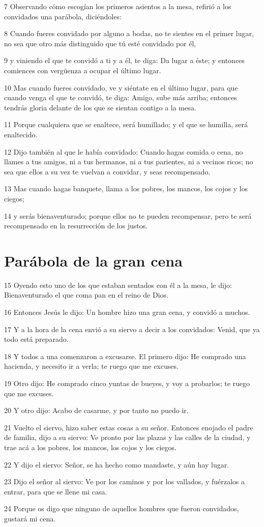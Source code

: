 \par 7 Observando cómo escogían los primeros asientos a la mesa, refirió a los convidados una parábola, diciéndoles:
\par 8 Cuando fueres convidado por alguno a bodas, no te sientes en el primer lugar, no sea que otro más distinguido que tú esté convidado por él,
\par 9 y viniendo el que te convidó a ti y a él, te diga: Da lugar a éste; y entonces comiences con vergüenza a ocupar el último lugar.
\par 10 Mas cuando fueres convidado, ve y siéntate en el último lugar, para que cuando venga el que te convidó, te diga: Amigo, sube más arriba; entonces tendrás gloria delante de los que se sientan contigo a la mesa.
\par 11 Porque cualquiera que se enaltece, será humillado; y el que se humilla, será enaltecido.
\par 12 Dijo también al que le había convidado: Cuando hagas comida o cena, no llames a tus amigos, ni a tus hermanos, ni a tus parientes, ni a vecinos ricos; no sea que ellos a su vez te vuelvan a convidar, y seas recompensado.
\par 13 Mas cuando hagas banquete, llama a los pobres, los mancos, los cojos y los ciegos;
\par 14 y serás bienaventurado; porque ellos no te pueden recompensar, pero te será recompensado en la resurrección de los justos.

\section*{Parábola de la gran cena}

\par 15 Oyendo esto uno de los que estaban sentados con él a la mesa, le dijo: Bienaventurado el que coma pan en el reino de Dios.
\par 16 Entonces Jesús le dijo: Un hombre hizo una gran cena, y convidó a muchos.
\par 17 Y a la hora de la cena envió a su siervo a decir a los convidados: Venid, que ya todo está preparado.
\par 18 Y todos a una comenzaron a excusarse. El primero dijo: He comprado una hacienda, y necesito ir a verla; te ruego que me excuses.
\par 19 Otro dijo: He comprado cinco yuntas de bueyes, y voy a probarlos; te ruego que me excuses.
\par 20 Y otro dijo: Acabo de casarme, y por tanto no puedo ir.
\par 21 Vuelto el siervo, hizo saber estas cosas a su señor. Entonces enojado el padre de familia, dijo a su siervo: Ve pronto por las plazas y las calles de la ciudad, y trae acá a los pobres, los mancos, los cojos y los ciegos.
\par 22 Y dijo el siervo: Señor, se ha hecho como mandaste, y aún hay lugar.
\par 23 Dijo el señor al siervo: Ve por los caminos y por los vallados, y fuérzalos a entrar, para que se llene mi casa.
\par 24 Porque os digo que ninguno de aquellos hombres que fueron convidados, gustará mi cena.

